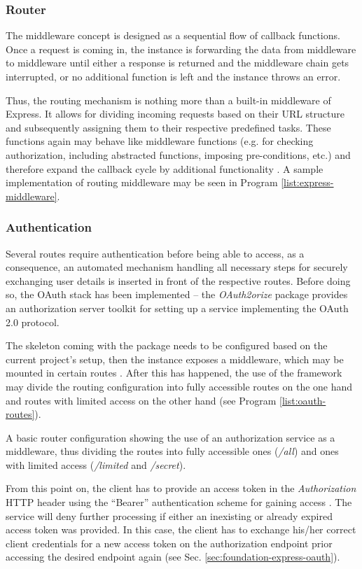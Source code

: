 \subsubsection{Router}
The middleware concept is designed as a sequential flow of callback functions. Once a request is coming in, the instance is forwarding the data from middleware to middleware until either a response is returned and the middleware chain gets interrupted, or no additional function is left and the instance throws an error.

Thus, the routing mechanism is nothing more than a built-in middleware of Express. It allows for dividing incoming requests based on their URL structure and subsequently assigning them to their respective predefined tasks. These functions again may behave like middleware functions (e.g. for checking authorization, including abstracted functions, imposing pre-conditions, etc.) and therefore expand the callback cycle by additional functionality \cite{ExpressRouter}. A sample implementation of routing middleware may be seen in Program \ref{list:express-middleware}.

\subsubsection{Authentication}
Several routes require authentication before being able to access, as a consequence, an automated mechanism handling all necessary steps for securely exchanging user details is inserted in front of the respective routes. Before doing so, the OAuth stack has been implemented -- the \emph{OAuth2orize} package provides an authorization server toolkit for setting up a service implementing the OAuth 2.0 protocol.

The skeleton coming with the package needs to be configured based on the current project's setup, then the instance exposes a middleware, which may be mounted in certain routes \cite{OAuth2orizeGitHub}. After this has happened, the use of the framework may divide the routing configuration into fully accessible routes on the one hand and routes with limited access on the other hand (see Program \ref{list:oauth-routes}).

\begin{program}
  \caption{A basic router configuration showing the use of an authorization service as a middleware, thus dividing the routes into fully accessible ones (\emph{/all}) and ones with limited access (\emph{/limited} and \emph{/secret}).}
  \label{list:oauth-routes}

\end{program}

From this point on, the client has to provide an access token in the \emph{Authorization} HTTP header using the ``Bearer'' authentication scheme for gaining access \cite[5]{RFC6750}. The service will deny further processing if either an inexisting or already expired access token was provided. In this case, the client has to exchange his/her correct client credentials for a new access token on the authorization endpoint prior accessing the desired endpoint again \cite[41]{hardt2012oauth} (see Sec. \ref{sec:foundation-express-oauth}).
